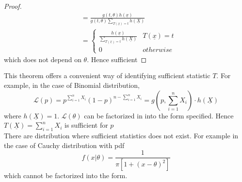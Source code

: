 \documentclass[11pt]{article}
\begin{document}
\begin{theorem*}
\begin{proof}
\begin{align*}
      &= \frac{g(t, \theta) h(\underline{x})}{ g(t, \theta) \sum_{T(\underline{x}) = t}  h(\underline{X})  }\tag{$g(t, \theta)$ is a constant} \\
      &=
      \begin{cases*}
        \frac{h(\underline{x})}{ \sum_{T(\underline{x}) = t}  h(\underline{X})  } & T(\underline{x}) = t\\
        0 & otherwise
      \end{cases*}
    \end{align*}
    which does not depend on $\theta$. Hence sufficient
  \end{proof}
  \begin{rem}
    This theorem offers a convenient way of identifying sufficient statistic $T$. For example, in the case of Binomial distribution,
    \[
      \mathcal{L}(p) = p^{\sum_{i=1}^n X_i} (1-p)^{n - \sum_{i=1}^n X_i} = g(p, \sum_{i=1}^n X_i) \cdot h(\underline{X})
    \]
    where $h(\underline{X}) = 1$. $\mathcal{L}(\theta)$ can be factorized in into the form specified. Hence $T(\underline{X}) = \sum_{i=1}^n X_i$ is sufficient for $p$\\
    There are distribution where sufficient statistics does not exist. For example in the case of Cauchy distribution with pdf
    \[
      f(x|\theta) = \frac{1}{\pi [ 1 + (x-\theta)^2]}
    \]
    which cannot be factorized into the form.
  \end{rem}
\end{theorem*}
\end{document}
